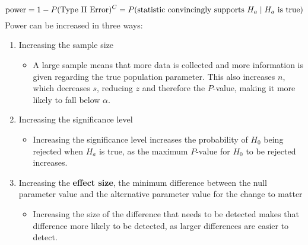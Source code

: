 \documentclass[../AP_Statistics.tex]{subfiles}
\begin{document}
		\[\mathrm{power} = 1 - P(\text{Type \Roman{2} Error})^C = P(\text{statistic convincingly supports } H_a \mid H_a \text{ is true})\]
		Power can be increased in three ways:
		\begin{enumerate}
			\item 
				Increasing the sample size
				\begin{itemize}
					\item 
						A large sample means that more data is collected and more information is given regarding the true population parameter. This also increases $n$, which decreases $s$, reducing $z$ and therefore the $P$-value, making it more likely to fall below $\alpha$.
				\end{itemize}
			\item 
				Increasing the significance level
				\begin{itemize}
					\item 
						Increasing the significance level increases the probability of $H_0$ being rejected when $H_a$ is true, as the maximum $P$-value for $H_0$ to be rejected increases.
				\end{itemize}
			\item 
				Increasing the \textbf{effect size}, the minimum difference between the null parameter value and the alternative parameter value for the change to matter
				\begin{itemize}
					\item 
						Increasing the size of the difference that needs to be detected makes that difference more likely to be detected, as larger differences are easier to detect.
				\end{itemize}
		\end{enumerate}
\end{document}
